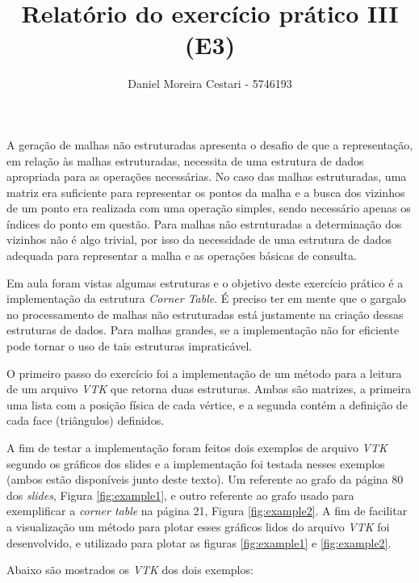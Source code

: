 \documentclass[a4paper]{article}
\title{Relatório do exercício prático III (E3)}
\author{Daniel Moreira Cestari - 5746193}
\begin{document}
\maketitle



A geração de malhas não estruturadas apresenta o desafio de que a representação, em relação às malhas estruturadas, necessita de uma estrutura de dados apropriada para as operações necessárias.
No caso das malhas estruturadas, uma matriz era suficiente para representar os pontos da malha e a busca dos vizinhos de um ponto era realizada com uma operação simples, sendo necessário apenas os índices do ponto em questão.
Para malhas não estruturadas a determinação dos vizinhos não é algo trivial, por isso da necessidade de uma estrutura de dados adequada para representar a malha e as operações básicas de consulta.

Em aula foram vistas algumas estruturas e o objetivo deste exercício prático é a implementação da estrutura \textit{Corner Table}.  É preciso ter em mente que o gargalo no processamento de malhas não estruturadas está justamente na criação dessas estruturas de dados. Para malhas grandes, se a implementação não for eficiente pode tornar o uso de tais estruturas impraticável.

 O primeiro passo do exercício foi a implementação de um método para a leitura de um arquivo \textit{VTK} que retorna duas estruturas. Ambas são matrizes, a primeira uma lista com a posição física de cada vértice, e a segunda contém a definição de cada face (triângulos) definidos.
 
 A fim de testar a implementação foram feitos dois exemplos de arquivo \textit{VTK} segundo os gráficos dos slides e a implementação foi testada nesses exemplos (ambos estão disponíveis junto deste texto). Um referente ao grafo da página 80 dos \textit{slides}, Figura \ref{fig:example1},  e outro referente ao grafo usado para exemplificar a \textit{corner table} na página 21, Figura \ref{fig:example2}. A fim de facilitar a visualização um método para plotar esses gráficos lidos do arquivo \textit{VTK} foi desenvolvido, e utilizado para plotar as figuras \ref{fig:example1} e \ref{fig:example2}.
 
 Abaixo são mostrados os \textit{VTK} dos dois exemplos:
 
\end{document}
